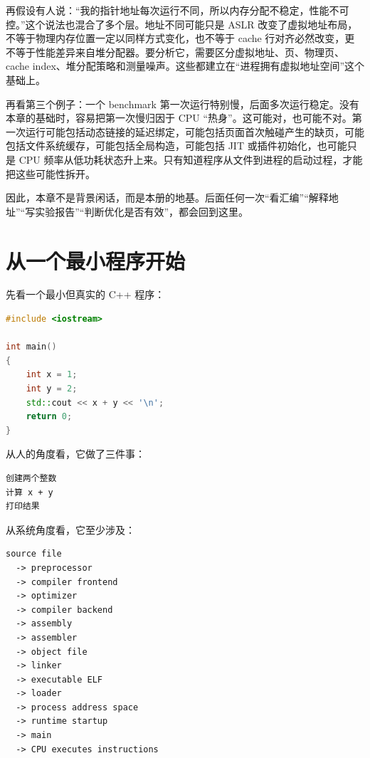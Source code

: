 再假设有人说：“我的指针地址每次运行不同，所以内存分配不稳定，性能不可控。”这个说法也混合了多个层。地址不同可能只是 ASLR 改变了虚拟地址布局，不等于物理内存位置一定以同样方式变化，也不等于 cache 行对齐必然改变，更不等于性能差异来自堆分配器。要分析它，需要区分虚拟地址、页、物理页、cache index、堆分配策略和测量噪声。这些都建立在“进程拥有虚拟地址空间”这个基础上。

再看第三个例子：一个 benchmark 第一次运行特别慢，后面多次运行稳定。没有本章的基础时，容易把第一次慢归因于 CPU “热身”。这可能对，也可能不对。第一次运行可能包括动态链接的延迟绑定，可能包括页面首次触碰产生的缺页，可能包括文件系统缓存，可能包括全局构造，可能包括 JIT 或插件初始化，也可能只是 CPU 频率从低功耗状态升上来。只有知道程序从文件到进程的启动过程，才能把这些可能性拆开。

因此，本章不是背景闲话，而是本册的地基。后面任何一次“看汇编”“解释地址”“写实验报告”“判断优化是否有效”，都会回到这里。

\section{从一个最小程序开始}

先看一个最小但真实的 C++ 程序：

\begin{lstlisting}[language=C++]
#include <iostream>

int main()
{
    int x = 1;
    int y = 2;
    std::cout << x + y << '\n';
    return 0;
}
\end{lstlisting}

从人的角度看，它做了三件事：

\begin{center}
\begin{minipage}{0.65\linewidth}
\begin{verbatim}
创建两个整数
计算 x + y
打印结果
\end{verbatim}
\end{minipage}
\end{center}

从系统角度看，它至少涉及：

\begin{center}
\begin{minipage}{0.82\linewidth}
\begin{verbatim}
source file
  -> preprocessor
  -> compiler frontend
  -> optimizer
  -> compiler backend
  -> assembly
  -> assembler
  -> object file
  -> linker
  -> executable ELF
  -> loader
  -> process address space
  -> runtime startup
  -> main
  -> CPU executes instructions
\end{verbatim}
\end{minipage}
\end{center}


